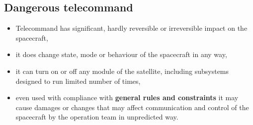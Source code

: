 \subsection{Dangerous telecommand}
\vspace{1em}
\begin{itemize}
    \item Telecommand has significant, hardly reversible or irreversible impact on the spacecraft,
    \item it does change state, mode or behaviour of the spacecraft in any way,
    \item it can turn on or off any module of the satellite, including subsystems designed to run limited number of times,
    \item even used with compliance with \textbf{general rules and constraints} it may cause damages or changes that may affect communication and control of the spacecraft by the operation team in unpredicted way.
\end{itemize}
